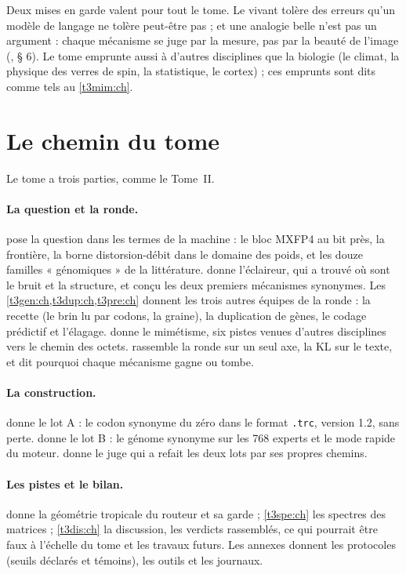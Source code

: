 Deux mises en garde valent pour tout le tome. Le vivant tolère des erreurs qu'un modèle de langage ne tolère peut-être pas ; et une analogie belle n'est pas un argument : chaque mécanisme se juge par la mesure, pas par la beauté de l'image (, § 6). Le tome emprunte aussi à d'autres disciplines que la biologie (le climat, la physique des verres de spin, la statistique, le cortex) ; ces emprunts sont dits comme tels au \cref{t3mim:ch}.

\section{Le chemin du tome}\label{t3int:sec:chemin}

Le tome a trois parties, comme le Tome~II.

\paragraph{La question et la ronde.}  pose la question dans les termes de la machine : le bloc MXFP4 au bit près, la frontière, la borne distorsion-débit dans le domaine des poids, et les douze familles « génomiques » de la littérature.  donne l'éclaireur, qui a trouvé où sont le bruit et la structure, et conçu les deux premiers mécanismes synonymes. Les \cref{t3gen:ch,t3dup:ch,t3pre:ch} donnent les trois autres équipes de la ronde : la recette (le brin lu par codons, la graine), la duplication de gènes, le codage prédictif et l'élagage.  donne le mimétisme, six pistes venues d'autres disciplines vers le chemin des octets.  rassemble la ronde sur un seul axe, la KL sur le texte, et dit pourquoi chaque mécanisme gagne ou tombe.

\paragraph{La construction.}  donne le lot A : le codon synonyme du zéro dans le format \texttt{.trc}, version 1.2, sans perte.  donne le lot B : le génome synonyme sur les 768 experts et le mode rapide du moteur.  donne le juge qui a refait les deux lots par ses propres chemins.

\paragraph{Les pistes et le bilan.}  donne la géométrie tropicale du routeur et sa garde ; \cref{t3spe:ch} les spectres des matrices ; \cref{t3dis:ch} la discussion, les verdicts rassemblés, ce qui pourrait être faux à l'échelle du tome et les travaux futurs. Les annexes donnent les protocoles (seuils déclarés et témoins), les outils et les journaux.

